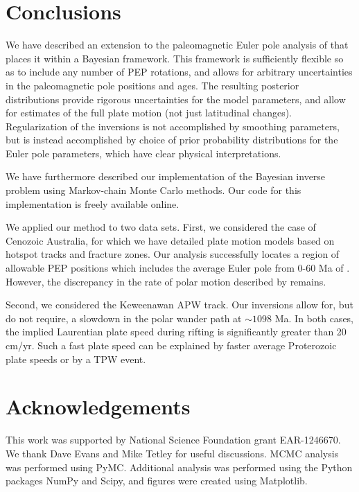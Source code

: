 \documentclass[preprint,12pt,authoryear]{elsarticle}
\begin{document}
\section{Conclusions}
\label{sec:conclusions}

We have described an extension to the paleomagnetic Euler pole analysis of 
\citet{gordon1984paleomagnetic} that places it within a Bayesian framework. 
This framework is sufficiently flexible so as to include any number of PEP rotations,
and allows for arbitrary uncertainties in the paleomagnetic pole positions and ages.
The resulting posterior distributions provide rigorous uncertainties for the model parameters,
and allow for estimates of the full plate motion (not just latitudinal changes).
Regularization of the inversions is not accomplished by smoothing parameters,
but is instead accomplished by choice of prior probability distributions for the Euler pole parameters,
which have clear physical interpretations.

We have furthermore described our implementation of the Bayesian inverse problem using Markov-chain
Monte Carlo methods. Our code for this implementation is freely available online.

We applied our method to two data sets. First, we considered the case of Cenozoic Australia,
for which we have detailed plate motion models based on hotspot tracks and fracture zones.
Our analysis successfully locates a region of allowable PEP positions which includes
the average Euler pole from 0-60 Ma of \citet{seton2012global}.
However, the discrepancy in the rate of polar motion described by \citet{idnurm1985lateII} remains.

Second, we considered the Keweenawan APW track.
Our inversions allow for, but do not require, a slowdown in the polar wander path at $\sim1098$ Ma.
In both cases, the implied Laurentian plate speed during rifting is significantly greater than 20 cm/yr.
Such a fast plate speed can be explained by faster average Proterozoic plate speeds or by a TPW event.

\section*{Acknowledgements}
\label{sec:acknowledgements}
This work was supported by National Science Foundation grant EAR-1246670. 
We thank Dave Evans and Mike Tetley for useful discussions.
MCMC analysis was performed using PyMC.
Additional analysis was performed using the Python packages NumPy and Scipy, and figures were created using Matplotlib.
\end{document}

